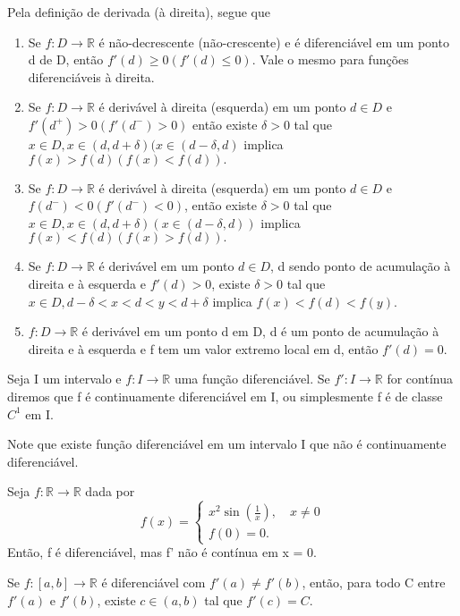 \documentclass[analysis_notes.tex]{subfiles}
\begin{document}
Pela defini\c cão de derivada (à direita), segue que
\begin{enumerate}
	\item Se \(f:D\rightarrow \mathbb{R}\) é não-decrescente (não-crescente) e é
	      diferenciável em um ponto d de D, então \(f'(d)\geq 0 (f'(d)\leq 0)\). Vale o mesmo
	      para fun\c cões diferenciáveis à direita.
	\item Se \(f:D\rightarrow \mathbb{R}\) é derivável à direita (esquerda) em um ponto
	      \(d\in D\) e \(f'(d^{+}) > 0 (f'(d^{-}) > 0)\) então existe \(\delta >0\) tal que
	      \(x\in D, x\in (d, d+\delta )(x\in (d-\delta , d)\) implica \(f(x) > f(d) (f(x) < f(d)).\)
	\item Se \(f:D\rightarrow \mathbb{R}\) é derivável à direita (esquerda) em um
	      ponto \(d\in D\) e \(f(d^{-}) < 0 (f'(d^{-}) < 0)\), então existe \(\delta >0\) tal que
	      \(x\in D, x\in(d, d+\delta )(x\in (d-\delta, d))\) implica \(f(x) < f(d) (f(x) > f(d)).\)
	\item Se \(f:D\rightarrow \mathbb{R}\) é derivável em um ponto \(d\in D\),
	      d sendo ponto de acumula\c cão à direita e à esquerda e \(f'(d) > 0\), existe \(\delta  > 0\)
	      tal que \(x\in D, d-\delta < x < d < y < d+\delta\) implica \(f(x) < f(d) < f(y).\)
	\item \(f:D\rightarrow \mathbb{R}\) é derivável em um ponto d em D, d é um ponto
	      de acumula\c cão à direita e à esquerda e f tem um valor extremo local em d, então \(f'(d) = 0.\)
\end{enumerate}
\begin{def*}
	Seja I um intervalo e \(f:I\rightarrow \mathbb{R}\) uma fun\c cão diferenciável.
	Se \(f':I\rightarrow \mathbb{R}\) for contínua diremos que f é continuamente diferenciável
	em I, ou simplesmente f é de classe \(C^{1}\) em I.
\end{def*}
Note que existe fun\c cão diferenciável em um intervalo I que não é
continuamente diferenciável.
\begin{example}
	Seja \(f:\mathbb{R}\rightarrow \mathbb{R}\) dada por
	\[
		f(x) = \left\{\begin{array}{ll}
			x^{2}\sin{(\frac{1}{x})},\quad x\neq0 \\
			f(0) = 0.
		\end{array}\right.
	\]
	Então, f é diferenciável, mas f' não é contínua em x = 0.
\end{example}
\hypertarget{darboux}{
	\begin{theorem*}
		Se \(f:[a, b]\rightarrow \mathbb{R}\) é diferenciável com \(f'(a)\neq f'(b)\), então,
		para todo C entre \(f'(a)\) e \(f'(b)\), existe \(c\in (a, b)\) tal que
		\(f'(c) = C\).
	\end{theorem*}}
\end{document}
